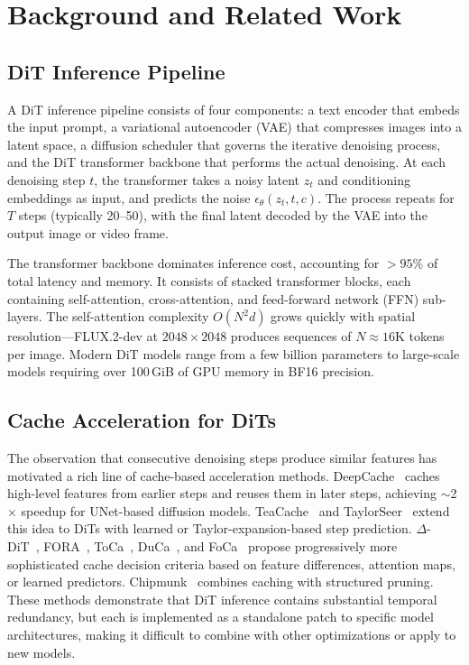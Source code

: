 \documentclass[10pt]{article}
\begin{document}
\section{Background and Related Work}

\subsection{DiT Inference Pipeline}

A DiT inference pipeline consists of four components: a text encoder that embeds the input prompt, a variational autoencoder (VAE) that compresses images into a latent space, a diffusion scheduler that governs the iterative denoising process, and the DiT transformer backbone that performs the actual denoising. At each denoising step $t$, the transformer takes a noisy latent $z_t$ and conditioning embeddings as input, and predicts the noise $\epsilon_\theta(z_t, t, c)$. The process repeats for $T$ steps (typically 20--50), with the final latent decoded by the VAE into the output image or video frame.

The transformer backbone dominates inference cost, accounting for $>95\%$ of total latency and memory. It consists of stacked transformer blocks, each containing self-attention, cross-attention, and feed-forward network (FFN) sub-layers. The self-attention complexity $O(N^2 d)$ grows quickly with spatial resolution---FLUX.2-dev at $2048\times2048$ produces sequences of $N\approx 16\text{K}$ tokens per image. Modern DiT models range from a few billion parameters to large-scale models requiring over 100\,GiB of GPU memory in BF16 precision.

\subsection{Cache Acceleration for DiTs}

The observation that consecutive denoising steps produce similar features has motivated a rich line of cache-based acceleration methods. DeepCache~\cite{ma2023deepcache} caches high-level features from earlier steps and reuses them in later steps, achieving $\sim$2$\times$ speedup for UNet-based diffusion models. TeaCache~\cite{liu2025teacache} and TaylorSeer~\cite{liu2025taylorseer} extend this idea to DiTs with learned or Taylor-expansion-based step prediction. $\Delta$-DiT~\cite{chen2024deltadit}, FORA~\cite{selvaraju2024fora}, ToCa~\cite{zou2025toca}, DuCa~\cite{zou2024duca}, and FoCa~\cite{zheng2025foca} propose progressively more sophisticated cache decision criteria based on feature differences, attention maps, or learned predictors. Chipmunk~\cite{silveria2025chipmunk} combines caching with structured pruning. These methods demonstrate that DiT inference contains substantial temporal redundancy, but each is implemented as a standalone patch to specific model architectures, making it difficult to combine with other optimizations or apply to new models.
\end{document}
